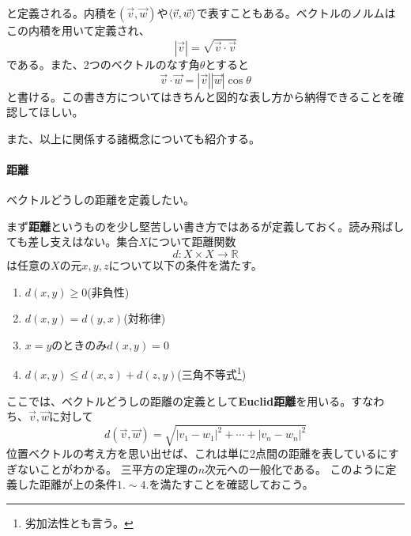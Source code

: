\documentclass[10pt]{jsreport}
\theoremstyle{definition}%
\newcommand{\vc}[1]{\overrightarrow{#1}}%
\numberwithin{equation}{section}%
\begin{document}
\begin{framed}
\begin{description}
\begin{equation}
  \end{equation}
と定義される。内積を$(\vec{v},\vec{w})$や$\braket{\vec{v},\vec{w}}$で表すこともある。ベクトルのノルムはこの内積を用いて定義され、
\begin{equation}
  |\vec{v}|=\sqrt{\vec{v}\cdot \vec{v}}
\end{equation}
である。また、2つのベクトルのなす角$\theta$とすると
\begin{equation}
  \vec{v}\cdot \vec{w}=|\vec{v}||\vec{w}|\cos{\theta}
\end{equation}
と書ける。この書き方についてはきちんと図的な表し方から納得できることを確認してほしい。
\end{description}
\end{framed}
また、以上に関係する諸概念についても紹介する。
\paragraph{距離}ベクトルどうしの距離を定義したい。


まず{\bf 距離}というものを少し堅苦しい書き方ではあるが定義しておく。読み飛ばしても差し支えはない。集合$X$について距離関数
\begin{equation}
  d:X\times X \to \mathbb{R}
\end{equation}
は任意の$X$の元$x,y,z$について以下の条件を満たす。
\begin{enumerate}
  \item $d(x,y)\geq 0$(非負性)
  \item $d(x,y)=d(y,x)$(対称律)
  \item $x=y$のときのみ$d(x,y)=0$
  \item $d(x,y)\leq d(x,z)+d(z,y)$(三角不等式\footnote{劣加法性とも言う。})
\end{enumerate}
ここでは、ベクトルどうしの距離の定義として{\bf Euclid距離}を用いる。すなわち、$\vc{v},\vc{w}$に対して
\begin{equation}
  \label{kyori}d(\vc{v},\vc{w})=\sqrt{|v_{1}-w_{1}|^{2}+\cdots +|v_{n}-w_{n}|^{2}}
\end{equation}
位置ベクトルの考え方を思い出せば、これは単に2点間の距離を表しているにすぎないことがわかる。
三平方の定理の$n$次元への一般化である。
このように定義した距離が上の条件$1.\sim 4.$を満たすことを確認しておこう。
\end{document}
